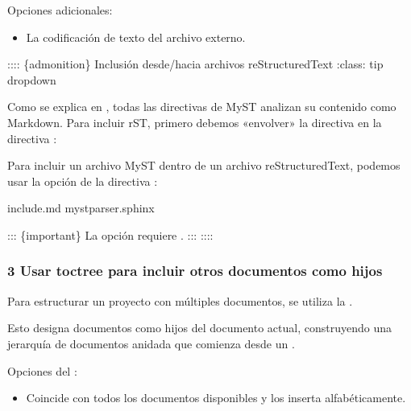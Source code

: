 \documentclass[a4paper,10pt,spanish]{sphinxmanual}
\begin{document}
\sphinxAtStartPar
Opciones adicionales:
\begin{itemize}
\item {} 
\sphinxAtStartPar
{} La codificación de texto del archivo externo.

\end{itemize}

\sphinxAtStartPar
:::: \{admonition\} Inclusión desde/hacia archivos reStructuredText
:class: tip dropdown

\sphinxAtStartPar
Como se explica en {\hyperref[\detokenize{configuracion_inicial/013.guia_de_myst_parser:syntax/directives/parsing}]{}}, todas las directivas de MyST analizan su contenido como Markdown.
Para incluir rST, primero debemos «envolver» la directiva en la directiva {\hyperref[\detokenize{configuracion_inicial/013.guia_de_myst_parser:syntax/directives/parsing}]{}}:

\sphinxAtStartPar
Para incluir un archivo MyST dentro de un archivo reStructuredText, podemos usar la opción  de la directiva :

\begin{sphinxVerbatim}[commandchars=\\\{\}]
  include.md
    myst\PYGZus{}parser.sphinx\PYGZus{}
\end{sphinxVerbatim}

\sphinxAtStartPar
::: \{important\}
La opción  requiere .
:::
::::


\subsubsection{3 Usar toctree para incluir otros documentos como hijos}
\label{\detokenize{configuracion_inicial/013.guia_de_myst_parser:usar-toctree-para-incluir-otros-documentos-como-hijos}}
\sphinxAtStartPar
Para estructurar un proyecto con múltiples documentos, se utiliza la .

\sphinxAtStartPar
Esto designa documentos como hijos del documento actual, construyendo una jerarquía de documentos anidada que comienza desde un .

\sphinxAtStartPar
Opciones del :
\begin{itemize}
\item {} 
\sphinxAtStartPar
{} Coincide con todos los documentos disponibles y los inserta alfabéticamente.

\end{itemize}
\end{document}
